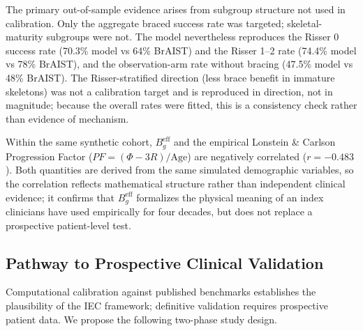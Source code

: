 The primary out-of-sample evidence arises from subgroup structure not used in calibration. Only the aggregate braced success rate was targeted; skeletal-maturity subgroups were not. The model nevertheless reproduces the Risser 0 success rate (70.3\% model vs 64\% BrAIST) and the Risser 1--2 rate (74.4\% model vs 78\% BrAIST), and the observation-arm rate without bracing (47.5\% model vs 48\% BrAIST). The Risser-stratified direction (less brace benefit in immature skeletons) was not a calibration target and is reproduced in direction, not in magnitude; because the overall rates were fitted, this is a consistency check rather than evidence of mechanism.

Within the same synthetic cohort, $B_g^{\mathrm{eff}}$ and the empirical Lonstein \& Carlson Progression Factor ($PF = (\Phi - 3R)/\mathrm{Age}$) are negatively correlated ($r = -0.483$). Both quantities are derived from the same simulated demographic variables, so the correlation reflects mathematical structure rather than independent clinical evidence; it confirms that $B_g^{\mathrm{eff}}$ formalizes the physical meaning of an index clinicians have used empirically for four decades, but does not replace a prospective patient-level test.

\subsection{Pathway to Prospective Clinical Validation}
\label{sec:prospective}

Computational calibration against published benchmarks establishes the plausibility of the IEC framework; definitive validation requires prospective patient data. We propose the following two-phase study design.

